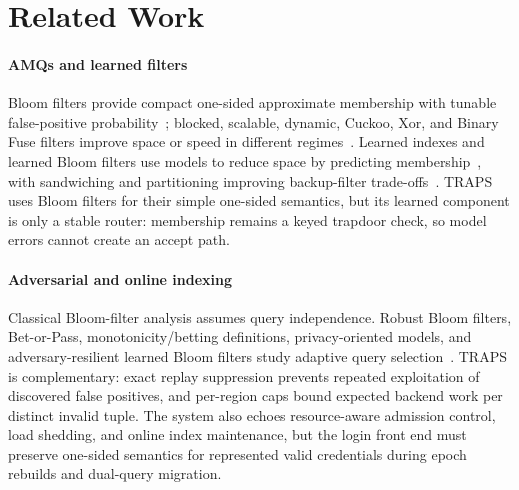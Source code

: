 \section{Related Work}
\label{sec:related-work}

\paragraph{AMQs and learned filters}
Bloom filters provide compact one-sided approximate membership with tunable false-positive probability~\cite{Bloom1970BloomFilter,broder2004network}; blocked, scalable, dynamic, Cuckoo, Xor, and Binary Fuse filters improve space or speed in different regimes~\cite{Putze2007BlockedBF,almeida2007scalable,Guo2006DynamicBloom,Fan2014CuckooFilter,Lemire2020XorFilter,Lemire2022BinaryFuse}. Learned indexes and learned Bloom filters use models to reduce space by predicting membership~\cite{Kraska2018LearnedIndex,Mitzenmacher2018NeurIPS}, with sandwiching and partitioning improving backup-filter trade-offs~\cite{Mitzenmacher2018NeurIPS,sato2023fast}. TRAPS uses Bloom filters for their simple one-sided semantics, but its learned component is only a stable router: membership remains a keyed trapdoor check, so model errors cannot create an accept path.

\paragraph{Adversarial and online indexing}
Classical Bloom-filter analysis assumes query independence. Robust Bloom filters, Bet-or-Pass, monotonicity/betting definitions, privacy-oriented models, and adversary-resilient learned Bloom filters study adaptive query selection~\cite{Naor2015AdversarialBF,NaorOved2022BetOrPass,LotanNaor2025MonotonicityBetting,Tirmazi2025PrivacyModelBF,Bishop2024AdversaryResilientLBF}. TRAPS is complementary: exact replay suppression prevents repeated exploitation of discovered false positives, and per-region caps bound expected backend work per distinct invalid tuple. The system also echoes resource-aware admission control, load shedding, and online index maintenance, but the login front end must preserve one-sided semantics for represented valid credentials during epoch rebuilds and dual-query migration.

